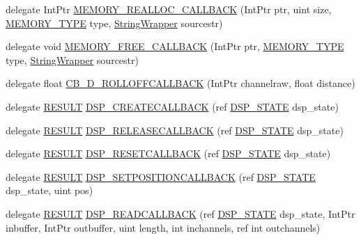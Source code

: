 \begin{DoxyCompactItemize}
\item 
delegate Int\+Ptr \hyperlink{namespace_f_m_o_d_a3d035f4158c569e31902d9ad59ab43f0}{M\+E\+M\+O\+R\+Y\+\_\+\+R\+E\+A\+L\+L\+O\+C\+\_\+\+C\+A\+L\+L\+B\+A\+CK} (Int\+Ptr ptr, uint size, \hyperlink{namespace_f_m_o_d_a3eb4c9654cbf371b668f8eb46358e931}{M\+E\+M\+O\+R\+Y\+\_\+\+T\+Y\+PE} type, \hyperlink{struct_f_m_o_d_1_1_string_wrapper}{String\+Wrapper} sourcestr)
\item 
delegate void \hyperlink{namespace_f_m_o_d_aa6d78ad454bb4b25659d9de9ca61fc42}{M\+E\+M\+O\+R\+Y\+\_\+\+F\+R\+E\+E\+\_\+\+C\+A\+L\+L\+B\+A\+CK} (Int\+Ptr ptr, \hyperlink{namespace_f_m_o_d_a3eb4c9654cbf371b668f8eb46358e931}{M\+E\+M\+O\+R\+Y\+\_\+\+T\+Y\+PE} type, \hyperlink{struct_f_m_o_d_1_1_string_wrapper}{String\+Wrapper} sourcestr)
\item 
delegate float \hyperlink{namespace_f_m_o_d_a6b260b8987f86dc39a7bc6978e080fc3}{C\+B\+\_\+D\+\_\+\+R\+O\+L\+L\+O\+F\+F\+C\+A\+L\+L\+B\+A\+CK} (Int\+Ptr channelraw, float distance)
\item 
delegate \hyperlink{namespace_f_m_o_d_a305d1176ef3f8c8815861a60407ac33d}{R\+E\+S\+U\+LT} \hyperlink{namespace_f_m_o_d_a197a0679ad072fd7854ff4b449c8ebeb}{D\+S\+P\+\_\+\+C\+R\+E\+A\+T\+E\+C\+A\+L\+L\+B\+A\+CK} (ref \hyperlink{struct_f_m_o_d_1_1_d_s_p___s_t_a_t_e}{D\+S\+P\+\_\+\+S\+T\+A\+TE} dsp\+\_\+state)
\item 
delegate \hyperlink{namespace_f_m_o_d_a305d1176ef3f8c8815861a60407ac33d}{R\+E\+S\+U\+LT} \hyperlink{namespace_f_m_o_d_ac5ab4cf6935c66ff1de18414c1093193}{D\+S\+P\+\_\+\+R\+E\+L\+E\+A\+S\+E\+C\+A\+L\+L\+B\+A\+CK} (ref \hyperlink{struct_f_m_o_d_1_1_d_s_p___s_t_a_t_e}{D\+S\+P\+\_\+\+S\+T\+A\+TE} dsp\+\_\+state)
\item 
delegate \hyperlink{namespace_f_m_o_d_a305d1176ef3f8c8815861a60407ac33d}{R\+E\+S\+U\+LT} \hyperlink{namespace_f_m_o_d_ae25f129e9819b5860c9cef999f6cf68d}{D\+S\+P\+\_\+\+R\+E\+S\+E\+T\+C\+A\+L\+L\+B\+A\+CK} (ref \hyperlink{struct_f_m_o_d_1_1_d_s_p___s_t_a_t_e}{D\+S\+P\+\_\+\+S\+T\+A\+TE} dsp\+\_\+state)
\item 
delegate \hyperlink{namespace_f_m_o_d_a305d1176ef3f8c8815861a60407ac33d}{R\+E\+S\+U\+LT} \hyperlink{namespace_f_m_o_d_a6dbd1188198e03257a7e8b7b7275a882}{D\+S\+P\+\_\+\+S\+E\+T\+P\+O\+S\+I\+T\+I\+O\+N\+C\+A\+L\+L\+B\+A\+CK} (ref \hyperlink{struct_f_m_o_d_1_1_d_s_p___s_t_a_t_e}{D\+S\+P\+\_\+\+S\+T\+A\+TE} dsp\+\_\+state, uint pos)
\item 
delegate \hyperlink{namespace_f_m_o_d_a305d1176ef3f8c8815861a60407ac33d}{R\+E\+S\+U\+LT} \hyperlink{namespace_f_m_o_d_a84203ed1830a5522384e1c84c8d13c7f}{D\+S\+P\+\_\+\+R\+E\+A\+D\+C\+A\+L\+L\+B\+A\+CK} (ref \hyperlink{struct_f_m_o_d_1_1_d_s_p___s_t_a_t_e}{D\+S\+P\+\_\+\+S\+T\+A\+TE} dsp\+\_\+state, Int\+Ptr inbuffer, Int\+Ptr outbuffer, uint length, int inchannels, ref int outchannels)

\end{DoxyCompactItemize}
